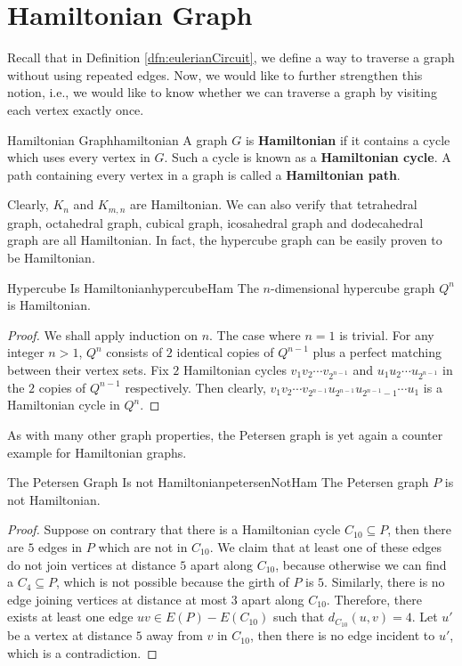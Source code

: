 \documentclass[math]{amznotes}
\theoremstyle{remark}
\newcommand{\0}{\mathbf{0}}
\newcommand{\1}{\mathbf{1}}
\begin{document}
\section{Hamiltonian Graph}
Recall that in Definition \ref{dfn:eulerianCircuit}, we define a way to traverse a graph without using repeated edges. Now, we would like to further strengthen this notion, i.e., we would like to know whether we can traverse a graph by visiting each vertex exactly once.
\begin{dfnbox}{Hamiltonian Graph}{hamiltonian}
    A graph $G$ is {\color{red} \textbf{Hamiltonian}} if it contains a cycle which uses every vertex in $G$. Such a cycle is known as a {\color{red} \textbf{Hamiltonian cycle}}. A path containing every vertex in a graph is called a {\color{red} \textbf{Hamiltonian path}}.
\end{dfnbox}
Clearly, $K_n$ and $K_{m, n}$ are Hamiltonian. We can also verify that tetrahedral graph, octahedral graph, cubical graph, icosahedral graph and dodecahedral graph are all Hamiltonian. In fact, the hypercube graph can be easily proven to be Hamiltonian.
\begin{probox}{Hypercube Is Hamiltonian}{hypercubeHam}
    The $n$-dimensional hypercube graph $Q^n$ is Hamiltonian.
    \tcblower
    \begin{proof}
        We shall apply induction on $n$. The case where $n = 1$ is trivial. For any integer $n > 1$, $Q^n$ consists of $2$ identical copies of $Q^{n - 1}
        $ plus a perfect matching between their vertex sets. Fix $2$ Hamiltonian cycles $v_1v_2\cdots v_{2^{n - 1}}$ and $u_1u_2\cdots u_{2^{n - 1}}$ in the $2$ copies of $Q^{n - 1}$ respectively. Then clearly, $v_1v_2\cdots v_{2^{n - 1}}u_{2^{n - 1}}u_{2^{n - 1} - 1}\cdots u_1$ is a Hamiltonian cycle in $Q^n$.
    \end{proof}
\end{probox}
As with many other graph properties, the Petersen graph is yet again a counter example for Hamiltonian graphs.
\begin{probox}{The Petersen Graph Is not Hamiltonian}{petersenNotHam}
    The Petersen graph $P$ is not Hamiltonian.
    \tcblower
    \begin{proof}
        Suppose on contrary that there is a Hamiltonian cycle $C_{10} \subseteq P$, then there are $5$ edges in $P$ which are not in $C_{10}$. We claim that at least one of these edges do not join vertices at distance $5$ apart along $C_{10}$, because otherwise we can find a $C_4 \subseteq P$, which is not possible because the girth of $P$ is $5$. Similarly, there is no edge joining vertices at distance at most $3$ apart along $C_{10}$. Therefore, there exists at least one edge $uv \in E(P) - E(C_{10})$ such that $d_{C_{10}}(u, v) = 4$. Let $u'$ be a vertex at distance $5$ away from $v$ in $C_{10}$, then there is no edge incident to $u'$, which is a contradiction.
    \end{proof}
\end{probox}
\end{document}
